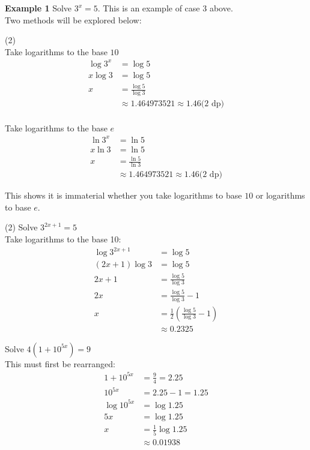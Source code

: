 \textbf{Example 1} Solve $3^{x} =5$. This is an example of case $3$ above.\medskip\\ 
\solution Two methods will be explored below:
\begin{tasks}[label-width={5em}](2)
\task[Method 1] \\Take logarithms to the base $10$\\
\begin{align*}\log  3^{x} &  = \log  5 \\
x \log  3 &  = \log  5 \\
x &  = \frac{\log  5}{\log  3} \\
&  \approx 1.464973521 \approx 1.46\text{(2 dp)}\end{align*}
\task[Method 2] \\Take logarithms to the base $e$\\
\begin{align*}\ln  3^{x} &  = \ln  5 \\
x \ln  3 &  = \ln  5 \\
x &  = \frac{\ln  5}{\ln  3} \\
&  \approx 1.464973521 \approx 1.46\text{(2 dp)}\end{align*}
\end{tasks}
This shows it is immaterial whether you take logarithms to base $10$ or logarithms to base $e$. 
\begin{tasks}[label-width={6em}](2)
\task[Example 2]
Solve $3^{2 x +1} =5$\\
\solution Take logarithms to the base 10:
\begin{align*}\log  3^{2 x +1} &  = \log  5 \\
\left (2 x +1\right ) \log  3 &  = \log  5 \\
2 x +1 &  = \frac{\log  5}{\log  3} \\
2 x &  = \frac{\log  5}{\log  3} -1 \\
x &  = \frac{1}{2} \left (\frac{\log  5}{\log  3} -1\right ) \\
&  \approx 0.2325 \end{align*}

\task[Example 3]
Solve $4 \left (1 +10^{5 x}\right ) =9$\\
\solution This must first be rearranged:
\begin{align*}1 +10^{5 x} &  = \frac{9}{4} =2.25 \\
10^{5 x} &  = 2.25 -1 =1.25 \\
\log  10^{5 x} &  = \log  1.25 \\
5 x &  = \log  1.25 \\
x &  = \frac{1}{5} \log  1.25 \\
&  \approx 0.01938 \end{align*}
\end{tasks}

